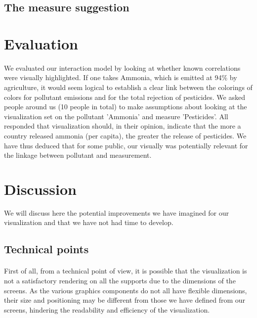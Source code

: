 \documentclass[preprint,journal]{vgtc}       %
\begin{document}
	\subsection{The measure suggestion}
	\paragraph{}

\section{Evaluation}

\paragraph{}
We evaluated our interaction model by looking at whether known correlations were visually highlighted.
If one takes Ammonia, which is emitted at 94\% by agriculture, it would seem logical to establish a clear link between the colorings of colors for pollutant emissions and for the total rejection of pesticides. We asked people around us (10 people in total) to make assumptions about looking at the visualization set on the pollutant 'Ammonia' and measure 'Pesticides'. All responded that visualization should, in their opinion, indicate that the more a country released ammonia (per capita), the greater the release of pesticides. We have thus deduced that for some public, our visually was potentially relevant for the linkage between pollutant and measurement.

\section{Discussion}

We will discuss here the potential improvements we have imagined for our visualization and that we have not had time to develop. 

\subsection{Technical points}

\paragraph{}
First of all, from a technical point of view, it is possible that the visualization is not a satisfactory rendering on all the supports due to the dimensions of the screens. As the various graphics components do not all have flexible dimensions, their size and positioning may be different from those we have defined from our screens, hindering the readability and efficiency of the visualization. 
\end{document}
